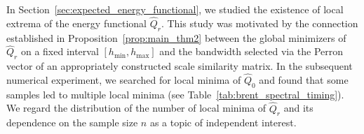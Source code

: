 In Section~\ref{sec:expected_energy_functional}, we studied the existence of local extrema of the energy functional $\hat{Q}_r$. This study was motivated by the connection established in Proposition~\ref{prop:main_thm2} between the global minimizers of $\hat{Q}_r$ on a fixed interval $[h_{\min},h_{\max}]$ and the bandwidth selected via the Perron vector of an appropriately constructed scale similarity matrix. In the subsequent numerical experiment, we searched for local minima of $\hat{Q}_0$ and found that some samples led to multiple local minima (see Table~\ref{tab:brent_spectral_timing}). We regard the distribution of the number of local minima of $\hat{Q}_r$ and its dependence on the sample size $n$ as a topic of independent interest.